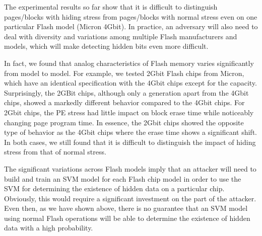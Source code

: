 The experimental results so far show that it is difficult to distinguish pages/blocks
with hiding stress from pages/blocks with normal stress even on one particular
Flash model (Micron 4Gbit). In practice, an adversary will also need to deal with
diversity and variations among multiple Flash manufacturers and models, which will make
detecting hidden bits even more difficult.

In fact, we found that analog characteristics of Flash memory varies significantly
from model to model.
For example, we tested 2Gbit Flash chips from Micron, which have an identical
specification with the 4Gbit chips except for the capacity. 
Surprisingly, the 2GBit chips, although only a generation apart from
the 4Gbit chips, showed a markedly different behavior compared to the 4Gbit chips. 
For 2Gbit chips, the PE stress had little impact on block erase time
while noticeably changing page program time. In essence, the 2Gbit chips showed
the opposite type of behavior as the 4Gbit chips where the erase time shows
a significant shift. In both cases, we still found that it is difficult to distinguish
the impact of hiding stress from that of normal stress. 


The significant variations across Flash models imply that an attacker will
need to build and train an SVM model for each Flash chip model in order to use the SVM
for determining the existence of hidden data on a particular chip. 
Obviously, this would require a significant investment on the part of the attacker.
Even then, as we have shown above, there is no guarantee that an SVM
model using normal Flash operations 
will be able to determine the existence of hidden data with a high
probability.

